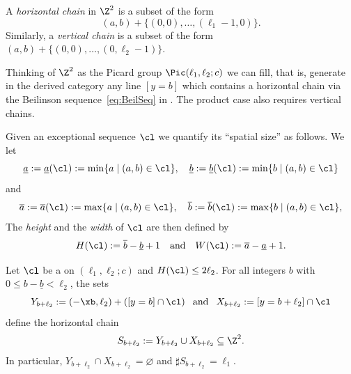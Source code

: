 \begin{defi}
\label{def:HorChain}
A {\em horizontal chain} in $\Z^2$ is 
a subset of the form 
$$
(a,b)+\{(0,0),\ldots,(\ell_1-1,0)\}.
$$
Similarly, a {\em vertical chain} is 
a subset of the form 
$(a,b)+\{(0,0),\ldots,(0,\ell_2-1)\}$.
\end{defi}

\begin{rema}
Thinking of $\Z^2$ as the Picard group 
$\Pic(\ell_1,\ell_2;c)$ we can fill, that is, 
generate in the derived category any 
line $[y=b]$ which contains a horizontal 
chain via the Beilinson 
sequence~\eqref{eq:BeilSeq} 
in . The product
case also requires vertical chains.
\end{rema}

Given an exceptional sequence $\cl$ we 
quantify its ``spatial size'' as follows. 
We let 
$$
\underline a:= \underline a(\cl):=
\min\{a\mid (a,b)\in\cl\},\quad
\underline b:=\underline b(\cl):=
\min\{b\mid(a,b)\in\cl\}
$$
and
$$
\overline a:=\overline a(\cl):=
\max\{a\mid (a,b)\in\cl\},\quad
\overline b:=\overline b(\cl):=
\max\{b\mid(a,b)\in\cl\},
$$
The {\em height} and the {\em width} 
of $\cl$ are then defined by 
$$
H(\cl):=\overline b-\underline b+1
\quad\mbox{and}\quad W(\cl):=
\overline a-\underline a+1.
$$ 

\begin{prop}
\label{prop:CompShape}
Let $\cl$ be a {\mes} on
$(\ell_1,\ell_2;c)$ and
$H(\cl)\leq2\ell_2$. For all integers $b$
with $0\leq b-\underline b<\ell_2$, the sets
$$
Y_{b+\ell_2}:=(-\xb,\ell_2)+([y=b]\cap\cl)
\hspace{0.8em}\mbox{and}\hspace{0.8em}
X_{b+\ell_2}:=[y=b+\ell_2]\cap\cl
$$
define the horizontal chain 
$$
S_{b+\ell_2}:=Y_{b+\ell_2}\cup X_{b+\ell_2}\subseteq\Z^2.
$$
In particular, $Y_{b+\ell_2}\cap X_{b+\ell_2}=\varnothing$ 
and $\sharp S_{b+\ell_2}=\ell_1$.
\end{prop}

